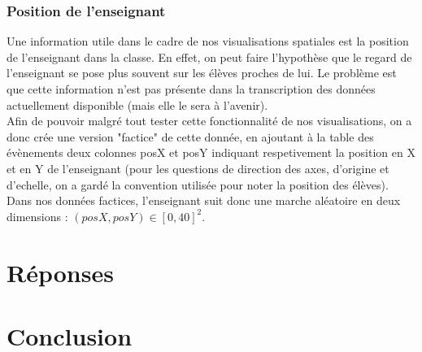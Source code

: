\documentclass{article}
\begin{document}
\subsubsection{Position de l'enseignant}
Une information utile dans le cadre de nos visualisations spatiales est la position de l'enseignant dans la classe. En effet, on peut faire l'hypothèse que le regard de l'enseignant se pose plus souvent sur les élèves proches de lui. Le problème est que cette information n'est pas présente dans la transcription des données actuellement disponible (mais elle le sera à l'avenir).\\
Afin de pouvoir malgré tout tester cette fonctionnalité de nos visualisations, on a donc crée une version "factice" de cette donnée, en ajoutant à la table des évènements deux colonnes posX et posY indiquant respetivement la position en X et en Y de l'enseignant (pour les questions de direction des axes, d'origine et d'echelle, on a gardé la convention utilisée pour noter la position des élèves). Dans nos données factices, l'enseignant suit donc une marche aléatoire en deux dimensions : $(posX, posY) \in [0, 40]^2$.

\section{Réponses}

\section{Conclusion}

{}

\end{document}
